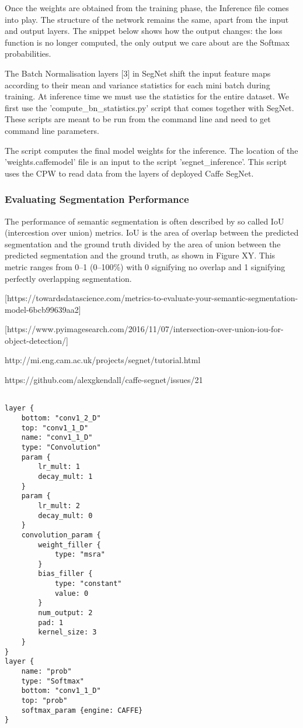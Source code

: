 Once the weights are obtained from the training phase, the Inference file comes into play. The structure of the network remains the same, apart from the input and output layers. The snippet below shows how the output changes: the loss function is no longer computed, the only output we care about are the Softmax probabilities. 

The Batch Normalisation layers [3] in SegNet shift the input feature maps according to their mean and variance statistics for each mini batch during training. At inference time we must use the statistics for the entire dataset. 
We first use the 'compute\_bn\_statistics.py' script that comes together with SegNet. These scripts are meant to be run from the command line and need to get command line parameters. 

The script computes the final model weights for the inference. The location of the 'weights.caffemodel' file is an input to the script 'segnet\_inference'. This script uses the CPW to read data from the layers of deployed Caffe SegNet. 

\subsubsection{Evaluating Segmentation Performance}

The performance of semantic segmentation is often described by so called IoU (intercestion over union) metrics. IoU is the area of overlap between the predicted segmentation and the ground truth divided by the area of union between the predicted segmentation and the ground truth, as shown in Figure XY. This metric ranges from 0–1 (0–100\%) with 0 signifying no overlap and 1 signifying perfectly overlapping segmentation.

[https://towardsdatascience.com/metrics-to-evaluate-your-semantic-segmentation-model-6bcb99639aa2]

[https://www.pyimagesearch.com/2016/11/07/intersection-over-union-iou-for-object-detection/]

http://mi.eng.cam.ac.uk/projects/segnet/tutorial.html

https://github.com/alexgkendall/caffe-segnet/issues/21

\begin{lstlisting}

layer {
	bottom: "conv1_2_D"
	top: "conv1_1_D"
	name: "conv1_1_D"
	type: "Convolution"
	param {
		lr_mult: 1
		decay_mult: 1
	}
	param {
		lr_mult: 2
		decay_mult: 0
	}
	convolution_param {
		weight_filler {
			type: "msra"
		}
		bias_filler {
			type: "constant"
			value: 0
		}
		num_output: 2
		pad: 1
		kernel_size: 3
	}
}
layer {
	name: "prob"
	type: "Softmax"
	bottom: "conv1_1_D"
	top: "prob"
	softmax_param {engine: CAFFE}
}

\end{lstlisting}